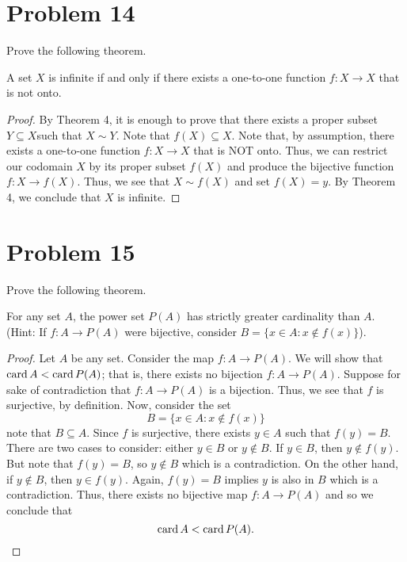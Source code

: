 \documentclass[11pt,a4paper]{article}
\begin{document}
\section{Problem 14} Prove the following theorem.
\begin{theorem}[ ]
    A set \( X  \) is infinite if and only if there exists a one-to-one function \( f: X \to X  \) that is not onto.
\end{theorem}
\begin{proof}
By Theorem 4, it is enough to prove that there exists a proper subset \( Y \subseteq X   \)such that \(X \sim Y  \). Note that \( f(X) \subseteq  X   \). Note that, by assumption, there exists a one-to-one function \( f: X \to X  \) that is NOT onto. Thus, we can restrict our codomain \( X  \) by its proper subset \( f(X) \) and produce the bijective function    \( f: X \to f(X) \). Thus, we see that \( X \sim f(X) \) and set \( f(X) = y \). By Theorem 4, we conclude that \( X  \) is infinite.
\end{proof}

\section{Problem 15} Prove the following theorem.
\begin{theorem}
    For any set \( A  \), the power set \( P(A) \) has strictly greater cardinality than \( A  \). (Hint: If \( f: A \to P(A) \) were bijective, consider \( B = \{ x \in A : x \notin f(x) \}  \)).
\end{theorem}
\begin{proof}
Let \( A  \) be any set. Consider the map \( f: A \to P(A) \). We will show that \( \operatorname{card} A < \operatorname{card} P(A) \); that is, there exists no bijection \( f: A \to P(A) \). Suppose for sake of contradiction that \( f: A \to P(A) \) is a bijection. Thus, we see that \( f  \) is surjective, by definition. Now, consider the set
\[  B = \{ x \in A : x \notin f(x)   \}  \]
note that \( B \subseteq  A  \). Since \( f  \) is surjective, there exists \( y \in A  \) such that \( f(y) = B  \). There are two cases to consider: either \( y \in B  \) or \( y \notin B  \). If \( y \in B  \), then \( y \notin f(y) \). But note that \( f(y) = B  \), so \( y \notin B  \) which is a contradiction. On the other hand, if \( y \notin B   \), then \( y \in f(y) \). Again, \( f(y) = B  \) implies \( y \) is also in \( B  \) which is a contradiction. Thus, there exists no bijective map \( f: A \to P(A) \) and so we conclude that  
\[  \operatorname{card} A < \operatorname{card} P(A). \]
\end{proof}
\end{document}
